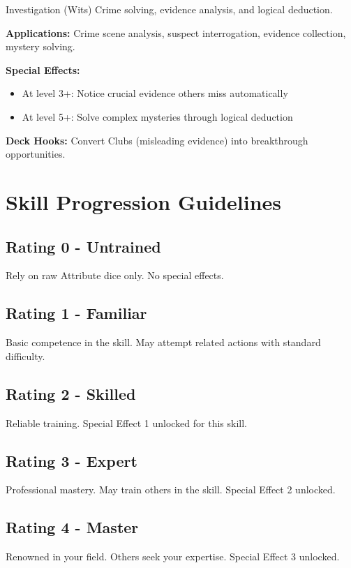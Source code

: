 \documentclass[11pt]{report}
\begin{document}
\begin{skillbox}{Investigation (Wits)}
Crime solving, evidence analysis, and logical deduction.

\textbf{Applications:} Crime scene analysis, suspect interrogation, evidence collection, mystery solving.

\textbf{Special Effects:}
\begin{itemize}
    \item At level 3+: Notice crucial evidence others miss automatically
    \item At level 5+: Solve complex mysteries through logical deduction
\end{itemize}

\textbf{Deck Hooks:} Convert Clubs (misleading evidence) into breakthrough opportunities.
\end{skillbox}

\section*{Skill Progression Guidelines}

\subsection*{Rating 0 - Untrained}
Rely on raw Attribute dice only. No special effects.

\subsection*{Rating 1 - Familiar}
Basic competence in the skill. May attempt related actions with standard difficulty.

\subsection*{Rating 2 - Skilled}
Reliable training. Special Effect 1 unlocked for this skill.

\subsection*{Rating 3 - Expert}
Professional mastery. May train others in the skill. Special Effect 2 unlocked.

\subsection*{Rating 4 - Master}
Renowned in your field. Others seek your expertise. Special Effect 3 unlocked.
\end{document}
